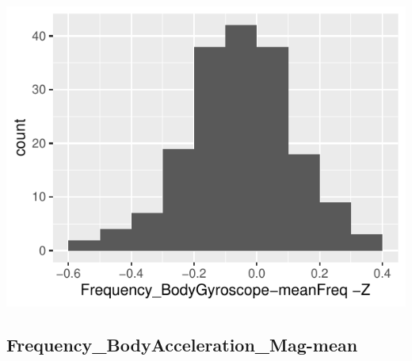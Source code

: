 \documentclass[
]{article}
\begin{document}
\begin{minipage}{0.25 \textwidth}

\includegraphics{codebook_tidydatasub_files/figure-latex/Var-69-Frequency-BodyGyroscope-meanFreq--Z-1.pdf}

\end{minipage}

\noindent\makebox[\linewidth]{\rule{\textwidth}{0.4pt}}

\hypertarget{frequency_bodyacceleration_mag-mean}{%
\subsection{Frequency\_BodyAcceleration\_Mag-mean}\label{frequency_bodyacceleration_mag-mean}}
\end{document}
